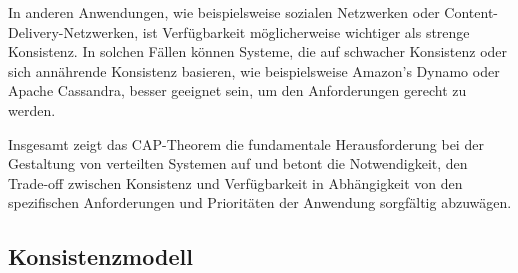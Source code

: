 In anderen Anwendungen, wie beispielsweise sozialen Netzwerken oder Content-Delivery-Netzwerken, ist Verfügbarkeit möglicherweise wichtiger als strenge Konsistenz. In solchen Fällen können Systeme, die auf schwacher Konsistenz oder  sich annährende Konsistenz basieren, wie beispielsweise Amazon's Dynamo oder Apache Cassandra, besser geeignet sein, um den Anforderungen gerecht zu werden.

Insgesamt zeigt das CAP-Theorem die fundamentale Herausforderung bei der Gestaltung von verteilten Systemen auf und betont die Notwendigkeit, den Trade-off zwischen Konsistenz und Verfügbarkeit in Abhängigkeit von den spezifischen Anforderungen und Prioritäten der Anwendung sorgfältig abzuwägen.

\subsection{Konsistenzmodell}

